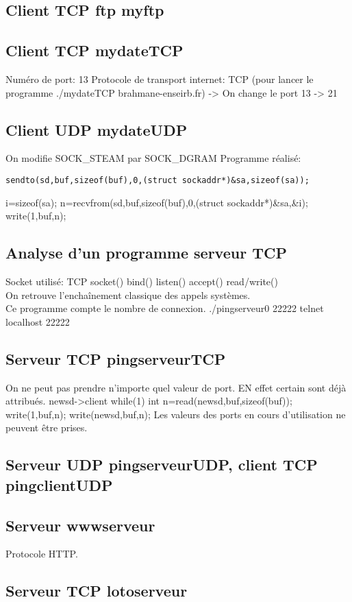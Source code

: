 \documentclass[paper=a4, fontsize=12pt]{article}
\numberwithin{equation}{section}		%
\numberwithin{figure}{section}			%
\numberwithin{table}{section}				%
\begin{document}
\subsection{Client TCP ftp myftp}
\subsection{Client TCP mydateTCP}
Numéro de port: 13 Protocole de transport internet: TCP
(pour lancer le programme ./mydateTCP brahmane-enseirb.fr)
-> On change le port 13 -> 21
\subsection{Client UDP mydateUDP}
On modifie SOCK_STEAM par SOCK_DGRAM
Programme réalisé:
\begin{lstlisting}
sendto(sd,buf,sizeof(buf),0,(struct sockaddr*)&sa,sizeof(sa));
\end{lstlisting}
i=sizeof(sa);
n=recvfrom(sd,buf,sizeof(buf),0,(struct sockaddr*)&sa,&i);
write(1,buf,n);
\subsection{Analyse d'un programme serveur TCP}
Socket utilisé: TCP
socket()
bind()
listen()
accept()
read/write()
\\On retrouve l'enchaînement classique des appels systèmes.
\\Ce programme compte le nombre de connexion.
./pingserveur0 22222
telnet localhost 22222
\subsection{Serveur TCP pingserveurTCP}
On ne peut pas prendre n'importe quel valeur de port. EN effet certain sont déjà attribués.
newsd->client
while(1){
int n=read(newsd,buf,sizeof(buf));
write(1,buf,n);
write(newsd,buf,n);
}
Les valeurs des ports en cours d'utilisation ne peuvent être prises.
\subsection{Serveur UDP pingserveurUDP, client TCP pingclientUDP}
\subsection{Serveur wwwserveur}
Protocole HTTP.
\subsection{Serveur TCP lotoserveur}

\end{document}
